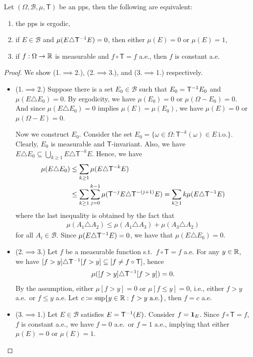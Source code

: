 \documentclass[a4paper]{article}
\begin{document}
\begin{lemma}\label{lem:ergodic-characterization}
	Let $(\Omega,\mathcal{B},\mu,\mathsf{T})$ be an \gls{pps}, then the following are equivalent:
	\begin{enumerate}
		\item the \gls{pps} is ergodic,
		\item if $E\in\mathcal{B}$ and $\mu(E\triangle\mathsf{T}^{-{1}} E)=0$, then either $\mu(E)=0$ or $\mu(E)=1$,
		\item if $f:\Omega\to\mathbb{R}$ is measurable and $f\circ\mathsf{T}=f$ a.e., then $f$ is constant a.e.
	\end{enumerate}
\end{lemma}
\begin{proof}
	We show (1.$\implies$2.), (2.$\implies$3.), and (3.$\implies$1.) respectively.
	\begin{itemize}
		\item(1.$\implies$2.)
			Suppose there is a set $E_0\in\mathcal{B}$ such that $E_0=\mathsf{T}^{-{1}} E_0$ and $\mu(E\triangle E_0)=0$.
			By ergodicity, we have $\mu(E_0)=0$ or $\mu(\Omega-E_0)=0$.
			And since $\mu(E\triangle E_0)=0$ implies $\mu(E)=\mu(E_0)$, we have $\mu(E)=0$ or $\mu(\Omega-E)=0$.

			Now we construct $E_0$.
			Consider the set $E_0=\{\omega\in\Omega:\mathsf{T}^{-k}(\omega)\in E\ \text{i.o.}\}$.
			Clearly, $E_0$ is measurable and $\mathsf{T}$-invariant.
			Also, we have $E\triangle E_0\subseteq\bigcup_{k\geq1}E\triangle\mathsf{T}^{-k}E$.
			Hence, we have
			\begin{align*}
				\mu(E\triangle E_0)
				&\leq \sum_{k\geq1} \mu(E\triangle\mathsf{T}^{-k}E) \\
				&\leq \sum_{k\geq1} \sum_{j=0}^{k-1} \mu(\mathsf{T}^{-j}E\triangle\mathsf{T}^{-(j+1)}E)
				= \sum_{k\geq1} k \mu(E\triangle \mathsf{T}^{-{1}} E)
			\end{align*}
			where the last inequality is obtained by the fact that
			\begin{align*}
				\mu(A_1\triangle A_2)\leq\mu(A_1\triangle A_3)+\mu(A_3\triangle A_2)
			\end{align*}
			for all $A_i\in\mathcal{B}$.
			Since $\mu(E\triangle \mathsf{T}^{-{1}} E)=0$, we have that $\mu(E\triangle E_0)=0$.
		\item(2.$\implies$3.)
			Let $f$ be a measurable function s.t.\ $f\circ\mathsf{T}=f$ a.e.
			For any $y\in\mathbb{R}$, we have
			$[f>y]\triangle\mathsf{T}^{-{1}}{[f>y]}\subseteq[f\neq f\circ\mathsf{T}]$,
			hence
			\begin{align*}
				\mu([f>y]\triangle\mathsf{T}^{-{1}}{[f>y]}) = 0.
			\end{align*}
			By the assumption, either $\mu[f>y]=0$ or $\mu[f\leq y]=0$, i.e.,
			either $f>y$ a.e.\ or $f\leq y$ a.e.
			Let $c\coloneqq\sup\{y\in\reals:f>y\ \text{a.e.}\}$,
			then $f=c$ a.e.
		\item(3.$\implies$1.)
			Let $E\in\mathcal{B}$ satisfies $E=\mathsf{T}^{-{1}}(E)$.
			Consider $f=\mathbf{1}_{E}$.
			Since $f\circ\mathsf{T}=f$, $f$ is constant a.e.,
			we have $f=0$ a.e.\ or $f=1$ a.e.,
			implying that either $\mu(E)=0$ or $\mu(E)=1$.
			\qedhere
	\end{itemize}
\end{proof}
\end{document}
